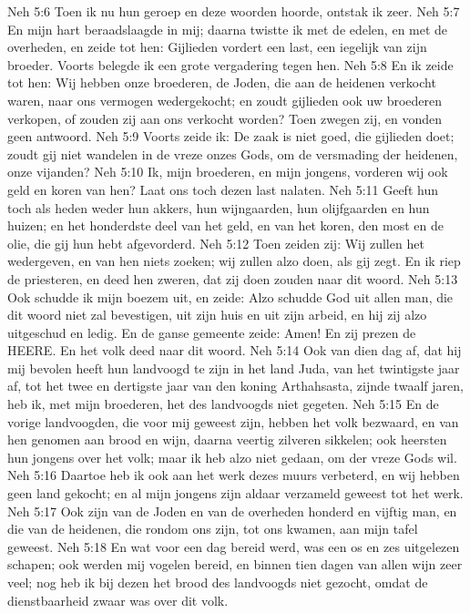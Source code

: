 Neh 5:6  Toen ik nu hun geroep en deze woorden hoorde, ontstak ik zeer.
Neh 5:7  En mijn hart beraadslaagde in mij; daarna twistte ik met de edelen, en met de overheden, en zeide tot hen: Gijlieden vordert een last, een iegelijk van zijn broeder. Voorts belegde ik een grote vergadering tegen hen.
Neh 5:8  En ik zeide tot hen: Wij hebben onze broederen, de Joden, die aan de heidenen verkocht waren, naar ons vermogen wedergekocht; en zoudt gijlieden ook uw broederen verkopen, of zouden zij aan ons verkocht worden? Toen zwegen zij, en vonden geen antwoord.
Neh 5:9  Voorts zeide ik: De zaak is niet goed, die gijlieden doet; zoudt gij niet wandelen in de vreze onzes Gods, om de versmading der heidenen, onze vijanden?
Neh 5:10  Ik, mijn broederen, en mijn jongens, vorderen wij ook geld en koren van hen? Laat ons toch dezen last nalaten.
Neh 5:11  Geeft hun toch als heden weder hun akkers, hun wijngaarden, hun olijfgaarden en hun huizen; en het honderdste deel van het geld, en van het koren, den most en de olie, die gij hun hebt afgevorderd.
Neh 5:12  Toen zeiden zij: Wij zullen het wedergeven, en van hen niets zoeken; wij zullen alzo doen, als gij zegt. En ik riep de priesteren, en deed hen zweren, dat zij doen zouden naar dit woord.
Neh 5:13  Ook schudde ik mijn boezem uit, en zeide: Alzo schudde God uit allen man, die dit woord niet zal bevestigen, uit zijn huis en uit zijn arbeid, en hij zij alzo uitgeschud en ledig. En de ganse gemeente zeide: Amen! En zij prezen de HEERE. En het volk deed naar dit woord.
Neh 5:14  Ook van dien dag af, dat hij mij bevolen heeft hun landvoogd te zijn in het land Juda, van het twintigste jaar af, tot het twee en dertigste jaar van den koning Arthahsasta, zijnde twaalf jaren, heb ik, met mijn broederen, het des landvoogds niet gegeten.
Neh 5:15  En de vorige landvoogden, die voor mij geweest zijn, hebben het volk bezwaard, en van hen genomen aan brood en wijn, daarna veertig zilveren sikkelen; ook heersten hun jongens over het volk; maar ik heb alzo niet gedaan, om der vreze Gods wil.
Neh 5:16  Daartoe heb ik ook aan het werk dezes muurs verbeterd, en wij hebben geen land gekocht; en al mijn jongens zijn aldaar verzameld geweest tot het werk.
Neh 5:17  Ook zijn van de Joden en van de overheden honderd en vijftig man, en die van de heidenen, die rondom ons zijn, tot ons kwamen, aan mijn tafel geweest.
Neh 5:18  En wat voor een dag bereid werd, was een os en zes uitgelezen schapen; ook werden mij vogelen bereid, en binnen tien dagen van allen wijn zeer veel; nog heb ik bij dezen het brood des landvoogds niet gezocht, omdat de dienstbaarheid zwaar was over dit volk.
